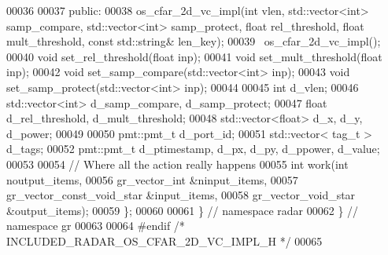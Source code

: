\begin{DoxyCode}
00036 
00037      \textcolor{keyword}{public}:
00038       os_cfar_2d_vc_impl(\textcolor{keywordtype}{int} vlen, std::vector<int> samp\_compare, std::vector<int> samp\_protect, \textcolor{keywordtype}{float} 
      rel\_threshold, \textcolor{keywordtype}{float} mult\_threshold, \textcolor{keyword}{const} std::string& len\_key);
00039       ~os_cfar_2d_vc_impl();
00040       \textcolor{keywordtype}{void} set_rel_threshold(\textcolor{keywordtype}{float} inp);
00041       \textcolor{keywordtype}{void} set_mult_threshold(\textcolor{keywordtype}{float} inp);
00042       \textcolor{keywordtype}{void} set_samp_compare(std::vector<int> inp);
00043       \textcolor{keywordtype}{void} set_samp_protect(std::vector<int> inp);
00044       
00045       \textcolor{keywordtype}{int} d_vlen;
00046       std::vector<int> d_samp_compare, d_samp_protect;
00047       \textcolor{keywordtype}{float} d_rel_threshold, d_mult_threshold;
00048       std::vector<float> d_x, d_y, d_power;
00049       
00050       pmt::pmt\_t d_port_id;
00051       std::vector< tag\_t > d_tags;
00052       pmt::pmt\_t d_ptimestamp, d_px, d_py, d_ppower, d_value;
00053 
00054       \textcolor{comment}{// Where all the action really happens}
00055       \textcolor{keywordtype}{int} work(\textcolor{keywordtype}{int} noutput\_items,
00056                gr\_vector\_int &ninput\_items,
00057                gr\_vector\_const\_void\_star &input\_items,
00058                gr\_vector\_void\_star &output\_items);
00059     \};
00060 
00061   \} \textcolor{comment}{// namespace radar}
00062 \} \textcolor{comment}{// namespace gr}
00063 
00064 \textcolor{preprocessor}{#endif }\textcolor{comment}{/* INCLUDED\_RADAR\_OS\_CFAR\_2D\_VC\_IMPL\_H */}\textcolor{preprocessor}{}
00065 
\end{DoxyCode}
